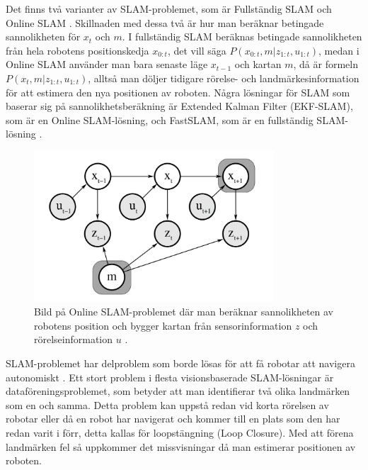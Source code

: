 Det finns två varianter av SLAM-problemet, som är Fullständig SLAM och Online SLAM \citep{ProbabilisticRobotics}. Skillnaden med dessa två är hur man beräknar betingade sannolikheten för $x_t$ och $m$. I fullständig SLAM beräknas betingade sannolikheten från hela robotens positionskedja $x_{0:t}$, det vill säga $P(x_{0:t}, m | z_{1:t}, u_{1:t})$, medan i Online SLAM använder man bara senaste läge $x_{t-1}$ och kartan $m$, då är formeln $P(x_t, m | z_{1:t}, u_{1:t})$, alltså man döljer tidigare rörelse- och landmärkesinformation för att estimera den nya positionen av roboten. Några lösningar för SLAM som baserar sig på sannolikhetsberäkning är Extended Kalman Filter (EKF-SLAM), som är en Online SLAM-lösning, och FastSLAM, som är en fullständig SLAM-lösning \citep{realslamproblem, ProbabilisticRobotics}. 

\begin{figure}[ht]
    \begin{center}
    \includegraphics[width=0.8\textwidth]{online-slam.JPG}
    \caption{Bild på Online SLAM-problemet där man beräknar sannolikheten av robotens position och bygger kartan från sensorinformation $z$ och rörelseinformation $u$ \citep{ProbabilisticRobotics}.}
    \label{slam-problemet}
    \end{center}
\end{figure}

SLAM-problemet har delproblem som borde lösas för att få robotar att navigera autonomiskt \citep{slamproblem}. Ett stort problem i flesta visionsbaserade SLAM-lösningar är dataföreningsproblemet, som betyder att man identifierar två olika landmärken som en och samma. Detta problem kan uppstå redan vid korta rörelsen av robotar eller då en robot har navigerat och kommer till en plats som den har redan varit i förr, detta kallas för loopstängning (Loop Closure). Med att förena landmärken fel så uppkommer det missvisningar då man estimerar positionen av roboten.

